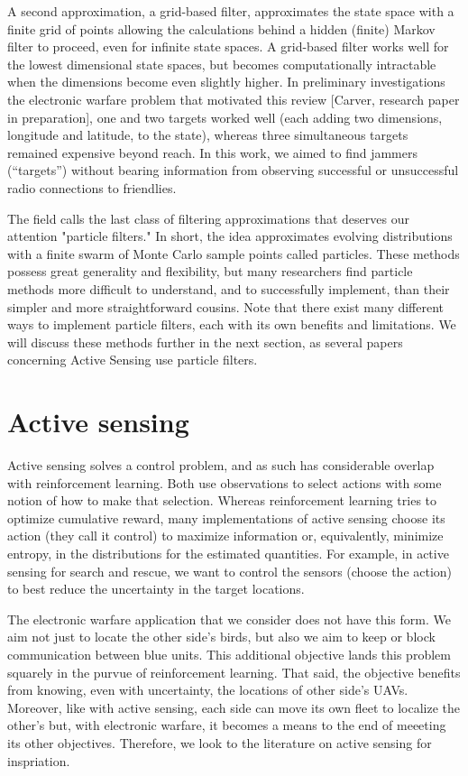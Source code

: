 \documentclass{article}
\begin{document}
A second approximation, a grid-based filter, approximates the state
space with a finite grid of points allowing the calculations behind a
hidden (finite) Markov filter to proceed, even for infinite state
spaces.  A grid-based filter works well for the lowest dimensional
state spaces, but becomes computationally intractable when the
dimensions become even slightly higher.  In preliminary investigations
the electronic warfare problem that motivated this review [Carver,
research paper in preparation], one and two targets worked well (each
adding two dimensions, longitude and latitude, to the state), whereas
three simultaneous targets remained expensive beyond reach.  In this
work, we aimed to find jammers (``targets'') without bearing
information from observing successful or unsuccessful radio
connections to friendlies.

The field calls the last class of filtering approximations that
deserves our attention "particle filters."  In short, the idea
approximates evolving distributions with a finite swarm of Monte Carlo
sample points called particles.  These methods possess great
generality and flexibility, but many researchers find particle methods
more difficult to understand, and to successfully implement, than
their simpler and more straightforward cousins.  Note that there exist
many different ways to implement particle filters, each with its own
benefits and limitations.  We will discuss these methods further in
the next section, as several papers concerning Active Sensing use
particle filters.

\section{Active sensing}

Active sensing solves a control problem, and as such has considerable
overlap with reinforcement learning.  Both use observations to select
actions with some notion of how to make that selection.  Whereas
reinforcement learning tries to optimize cumulative reward, many
implementations of active sensing choose its action (they call it
control) to maximize information or, equivalently, minimize entropy,
in the distributions for the estimated quantities.  For example, in
active sensing for search and rescue, we want to control the sensors
(choose the action) to best reduce the uncertainty in the target
locations.

The electronic warfare application that we consider does not have this
form.  We aim not just to locate the other side's birds, but also we
aim to keep or block communication between blue units.  This
additional objective lands this problem squarely in the purvue of
reinforcement learning.  That said, the objective benefits from
knowing, even with uncertainty, the locations of other side's UAVs.
Moreover, like with active sensing, each side can move its own fleet
to localize the other's but, with electronic warfare, it becomes a
means to the end of meeeting its other objectives.  Therefore, we look
to the literature on active sensing for inspriation.
\end{document}
